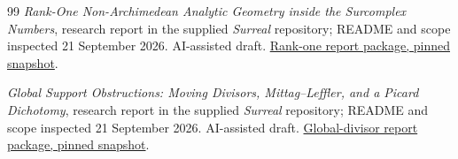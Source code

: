 \documentclass[11pt]{article}
\theoremstyle{plain}
\theoremstyle{plain}
\theoremstyle{plain}
\theoremstyle{definition}
\theoremstyle{definition}
\theoremstyle{definition}
\theoremstyle{remark}
\begin{document}
\begin{thebibliography}{99}
\emph{Rank-One Non-Archimedean Analytic Geometry inside the Surcomplex
Numbers}, research report in the supplied \emph{Surreal} repository;
README and scope inspected 21 September 2026. AI-assisted draft.
\href{https://github.com/VladimirReshetnikov/Surreal/tree/4896a2808ce30e01b1c86ae3ba2295a64762d246/docs/surcomplex/rank-one-berkovich}{Rank-one report package, pinned snapshot}.

\emph{Global Support Obstructions: Moving Divisors, Mittag--Leffler,
and a Picard Dichotomy}, research report in the supplied \emph{Surreal}
repository; README and scope inspected 21 September 2026. AI-assisted
draft.
\href{https://github.com/VladimirReshetnikov/Surreal/tree/4896a2808ce30e01b1c86ae3ba2295a64762d246/docs/surcomplex/global-divisors}{Global-divisor report package, pinned snapshot}.
\end{thebibliography}
\end{document}
